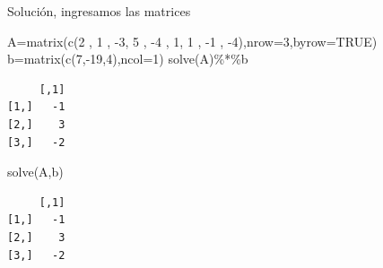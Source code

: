 \documentclass[
  ignorenonframetext,
  aspectratio=169,
  spanish,
]{beamer}
\newenvironment{Shaded}{\begin{snugshade}}{\end{snugshade}}
\newcommand{\AttributeTok}[1]{\textcolor[rgb]{0.40,0.45,0.13}{#1}}
\newcommand{\ConstantTok}[1]{\textcolor[rgb]{0.56,0.35,0.01}{#1}}
\newcommand{\DecValTok}[1]{\textcolor[rgb]{0.68,0.00,0.00}{#1}}
\newcommand{\FunctionTok}[1]{\textcolor[rgb]{0.28,0.35,0.67}{#1}}
\newcommand{\NormalTok}[1]{\textcolor[rgb]{0.00,0.23,0.31}{#1}}
\newcommand{\OtherTok}[1]{\textcolor[rgb]{0.00,0.23,0.31}{#1}}
\newcommand{\SpecialCharTok}[1]{\textcolor[rgb]{0.37,0.37,0.37}{#1}}
\begin{document}
\begin{frame}[fragile]{Solución, ingresamos las matrices}
\label{soluciuxf3n-ingresamos-las-matrices}
\begin{Shaded}
\begin{Highlighting}[]
\NormalTok{A}\OtherTok{=}\FunctionTok{matrix}\NormalTok{(}\FunctionTok{c}\NormalTok{(}\DecValTok{2}\NormalTok{ , }\DecValTok{1}\NormalTok{  , }\SpecialCharTok{{-}}\DecValTok{3}\NormalTok{,}
\DecValTok{5}\NormalTok{ , }\SpecialCharTok{{-}}\DecValTok{4}\NormalTok{ , }\DecValTok{1}\NormalTok{,}
\DecValTok{1}\NormalTok{ , }\SpecialCharTok{{-}}\DecValTok{1}\NormalTok{ , }\SpecialCharTok{{-}}\DecValTok{4}\NormalTok{),}\AttributeTok{nrow=}\DecValTok{3}\NormalTok{,}\AttributeTok{byrow=}\ConstantTok{TRUE}\NormalTok{)}
\NormalTok{b}\OtherTok{=}\FunctionTok{matrix}\NormalTok{(}\FunctionTok{c}\NormalTok{(}\DecValTok{7}\NormalTok{,}\SpecialCharTok{{-}}\DecValTok{19}\NormalTok{,}\DecValTok{4}\NormalTok{),}\AttributeTok{ncol=}\DecValTok{1}\NormalTok{) }
\FunctionTok{solve}\NormalTok{(A)}\SpecialCharTok{\%*\%}\NormalTok{b}
\end{Highlighting}
\end{Shaded}

\begin{verbatim}
     [,1]
[1,]   -1
[2,]    3
[3,]   -2
\end{verbatim}

\begin{Shaded}
\begin{Highlighting}[]
\FunctionTok{solve}\NormalTok{(A,b) }
\end{Highlighting}
\end{Shaded}

\begin{verbatim}
     [,1]
[1,]   -1
[2,]    3
[3,]   -2
\end{verbatim}
\end{frame}
\end{document}
